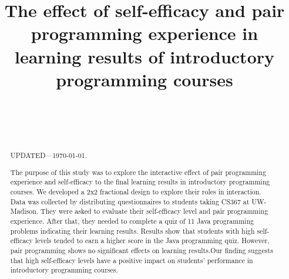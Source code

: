 \documentclass{sigchi}
\def\plaintitle{ The effect of self-efficacy and pair programming experience in learning results of introductory programming courses}
\begin{document}
\title{\plaintitle}

\author{%
  \\
  \\
  \\
}

\maketitle

\begin{abstract}
  UPDATED---\today.


The purpose of this study was to explore the interactive effect of pair programming experience and self-efficacy to the final learning results in introductory programming courses. We developed a 2x2 fractional design to explore their roles in interaction. Data was collected by distributing questionnaires to students taking CS367  at UW-Madison. They were asked to evaluate their self-efficacy level and pair programming experience. After that, they needed to complete a quiz of 11 Java programming problems indicating their learning results. Results show that students with high self-efficacy levels tended to earn a higher score in the Java programming quiz.  However, pair programming shows no significant effects on learning results.Our finding suggests that high self-efficacy levels have a positive impact on students' performance in introductory programming courses.

\end{abstract}

\end{document}
